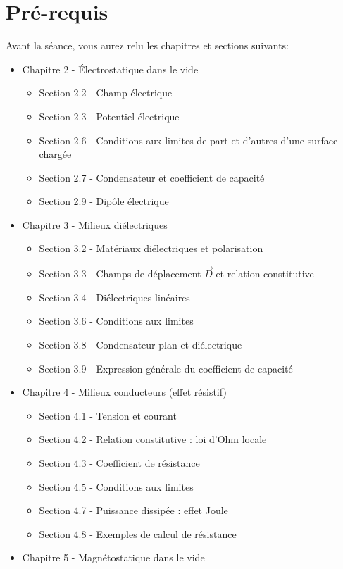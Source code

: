 \section{Pré-requis}
Avant la séance, vous aurez relu les chapitres et sections suivants:
\begin{itemize}
	\item Chapitre 2 - Électrostatique dans le vide 
		\begin{itemize}
		\item Section 2.2 - Champ électrique
		\item Section 2.3 - Potentiel électrique
		\item Section 2.6 - Conditions aux limites de part et d'autres d'une surface chargée
		\item Section 2.7 - Condensateur et coefficient de capacité
		\item Section 2.9 - Dipôle électrique
		\end{itemize}
	\item Chapitre 3 - Milieux diélectriques
		\begin{itemize}
		\item Section 3.2 - Matériaux diélectriques et polarisation
		\item Section 3.3 - Champs de déplacement $\Vec{D}$ et relation constitutive
		\item Section 3.4 - Diélectriques linéaires
		\item Section 3.6 - Conditions aux limites
		\item Section 3.8 - Condensateur plan et diélectrique 
		\item Section 3.9 - Expression générale du coefficient de capacité
		\end{itemize}
	\item Chapitre 4 - Milieux conducteurs (effet résistif)
		\begin{itemize}
		\item Section 4.1 - Tension et courant
		\item Section 4.2 - Relation constitutive : loi d'Ohm locale
		\item Section 4.3 - Coefficient de résistance
		\item Section 4.5 - Conditions aux limites
		\item Section 4.7 - Puissance dissipée : effet Joule
		\item Section 4.8 - Exemples de calcul de résistance
		\end{itemize}
	\item Chapitre 5 - Magnétostatique dans le vide

\end{itemize}
